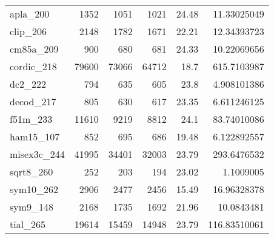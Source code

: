 \begin{table}[tbp]
\begin{tabular}{l|r|r|r|r|r}
      apla\_200                      &1352                      &1051                       &1021                       &24.48                               &11.33025049                           \\
      clip\_206                      &2148                      &1782                       &1671                       &22.21                               &12.34393723                           \\
      cm85a\_209                     &900                       &680                        &681                        &24.33                               &10.22069656                           \\
      cordic\_218                    &79600                     &73066                      &64712                      &18.7                                &615.7103987                           \\
      dc2\_222                       &794                       &635                        &605                        &23.8                                &4.908101386                           \\
      decod\_217                     &805                       &630                        &617                        &23.35                               &6.611246125                           \\
      f51m\_233                      &11610                     &9219                       &8812                       &24.1                                &83.74010086                           \\
      ham15\_107                     &852                       &695                        &686                        &19.48                               &6.122892557                           \\
      misex3c\_244                   &41995                     &34401                      &32003                      &23.79                               &293.6476532                           \\
      sqrt8\_260                     &252                       &203                        &194                        &23.02                               &1.1009005                           \\
      sym10\_262                     &2906                      &2477                       &2456                       &15.49                               &16.96328378                           \\
      sym9\_148                      &2168                      &1735                       &1692                       &21.96                               &10.0843481                           \\
      tial\_265                      &19614                     &15459                      &14948                      &23.79                               &116.83510061                           \\ \hline
  \end{tabular}
\end{table}


